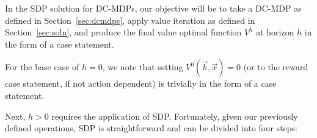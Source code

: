 \documentclass[letterpaper]{article}
\begin{document}

In the SDP solution for DC-MDPs, our objective will be to take
a DC-MDP as defined in Section~\ref{sec:dcmdps}, apply value
iteration as defined in Section~\ref{sec:soln}, and produce
the final value optimal function $V^h$ at horizon $h$ in the form
of a case statement.

For the base case of $h=0$, we note that setting $V^0(\vec{b},\vec{x}) = 0$
(or to the reward case statement, if not action dependent)
is trivially in the form of a case statement.  

Next, $h > 0$ requires the application of SDP.  
Fortunately, given our previously defined
operations, SDP is straightforward and can be divided into four 
steps: 
\end{document}
